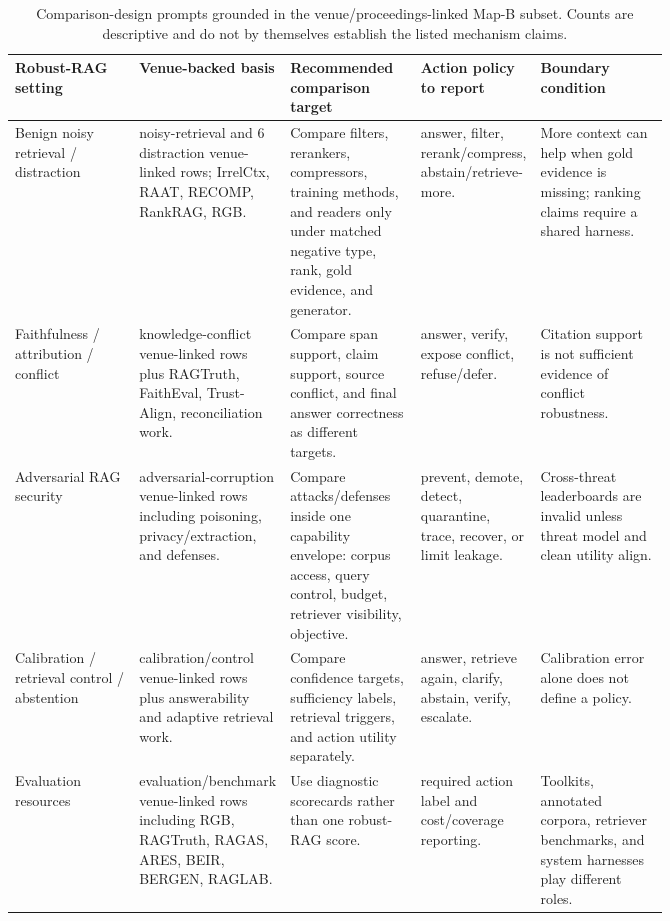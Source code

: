 \begin{table}[t]
\centering
\scriptsize
\renewcommand{\arraystretch}{0.9}
\begin{tabularx}{\linewidth}{>{\raggedright\arraybackslash}p{0.19\linewidth}>{\raggedright\arraybackslash}p{0.19\linewidth}>{\raggedright\arraybackslash}p{0.20\linewidth}>{\raggedright\arraybackslash}p{0.18\linewidth}X}
\toprule
\textbf{Robust-RAG setting} & \textbf{Venue-backed basis} & \textbf{Recommended comparison target} & \textbf{Action policy to report} & \textbf{Boundary condition} \\
\midrule
Benign noisy retrieval / distraction & 22 noisy-retrieval and 6 distraction venue-linked rows; IrrelCtx, RAAT, RECOMP, RankRAG, RGB. & Compare filters, rerankers, compressors, training methods, and readers only under matched negative type, rank, gold evidence, and generator. & answer, filter, rerank/compress, abstain/retrieve-more. & More context can help when gold evidence is missing; ranking claims require a shared harness. \\
Faithfulness / attribution / conflict & 16 knowledge-conflict venue-linked rows plus RAGTruth, FaithEval, Trust-Align, reconciliation work. & Compare span support, claim support, source conflict, and final answer correctness as different targets. & answer, verify, expose conflict, refuse/defer. & Citation support is not sufficient evidence of conflict robustness. \\
Adversarial RAG security & 26 adversarial-corruption venue-linked rows including poisoning, privacy/extraction, and defenses. & Compare attacks/defenses inside one capability envelope: corpus access, query control, budget, retriever visibility, objective. & prevent, demote, detect, quarantine, trace, recover, or limit leakage. & Cross-threat leaderboards are invalid unless threat model and clean utility align. \\
Calibration / retrieval control / abstention & 20 calibration/control venue-linked rows plus answerability and adaptive retrieval work. & Compare confidence targets, sufficiency labels, retrieval triggers, and action utility separately. & answer, retrieve again, clarify, abstain, verify, escalate. & Calibration error alone does not define a policy. \\
Evaluation resources & 28 evaluation/benchmark venue-linked rows including RGB, RAGTruth, RAGAS, ARES, BEIR, BERGEN, RAGLAB. & Use diagnostic scorecards rather than one robust-RAG score. & required action label and cost/coverage reporting. & Toolkits, annotated corpora, retriever benchmarks, and system harnesses play different roles. \\
\bottomrule
\end{tabularx}
\caption{Comparison-design prompts grounded in the venue/proceedings-linked Map-B subset. Counts are descriptive and do not by themselves establish the listed mechanism claims.}
\label{tab:venue-backed-recommendations}
\end{table}
